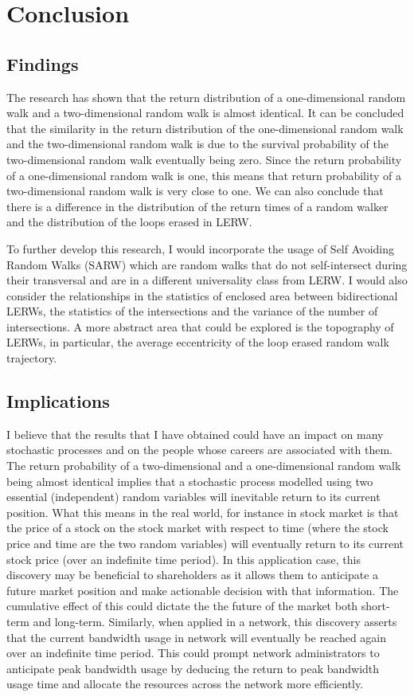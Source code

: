 \documentclass{article}
\begin{document}
\section{Conclusion}
\subsection{Findings}
The research has shown that the return distribution of a one-dimensional random walk and a two-dimensional random walk is almost identical. It can be concluded that the similarity in the return distribution of the one-dimensional random walk and the two-dimensional random walk is due to the survival probability of the two-dimensional random walk eventually being zero. Since the return probability of a one-dimensional random walk is one, this means that return probability of a two-dimensional random walk is very close to one. We can also conclude that there is a difference in the distribution of the return times of a random walker and the distribution of the loops erased in LERW.

To further develop this research, I would incorporate the usage of Self Avoiding Random Walks (SARW) which are random walks that do not self-intersect during their transversal and are in a different universality class from LERW. I would also consider the relationships in the statistics of enclosed area between bidirectional LERWs, the statistics of the intersections and the variance of the number of intersections. A more abstract area that could be explored is the topography of LERWs, in particular, the average eccentricity of the loop erased random walk trajectory.

\subsection{Implications}
I believe that the results that I have obtained could have an impact on many stochastic processes and on the people whose careers are associated with them. The return probability of a two-dimensional and a one-dimensional random walk being almost identical implies that a stochastic process modelled using two essential (independent) random variables will inevitable return to its current position. What this means in the real world, for instance in stock market is that the price of a stock on the stock market with respect to time (where the stock price and time are the two random variables) will eventually return to its current stock price (over an indefinite time period). In this application case, this discovery may be beneficial to shareholders as it allows them to anticipate a future market position and make actionable decision with that information. The cumulative effect of this could dictate the the future of the market both short-term and long-term. Similarly, when applied in a network, this discovery asserts that the current bandwidth usage in network will eventually be reached again over an indefinite time period. This could prompt network administrators to anticipate peak bandwidth usage by deducing the return to peak bandwidth usage time and allocate the resources across the network more efficiently.
\end{document}
